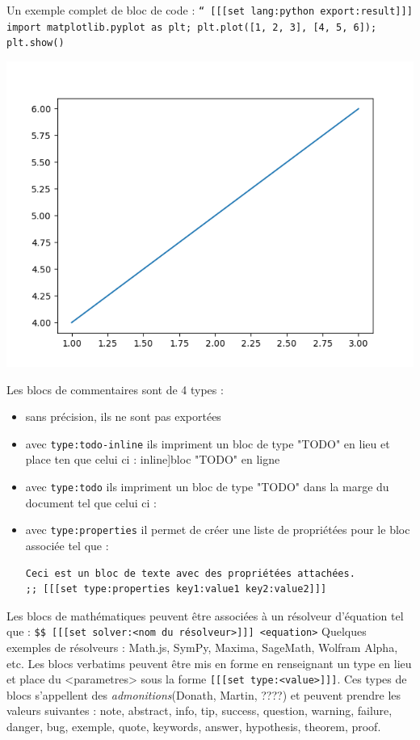 \documentclass[a4paper,12pt]{article}
\def\todo#1{}%
\begin{document}
Un exemple complet de bloc de code : \breakline
\texttt{`` [[[set lang:python export:result]]] import matplotlib.pyplot as plt; plt.plot([1, 2, 3], [4, 5, 6]); plt.show()}

\begin{center}
\includegraphics[width=.9\linewidth]{./quickDoc-exemple-code.png}
\end{center}

\newline
Les blocs de commentaires sont de 4 types :
\begin{itemize}
\item sans précision, ils ne sont pas exportées
\item avec \texttt{type:todo-inline} ils impriment un bloc de type "TODO" en lieu et place ten que celui ci : \todo[inline]{bloc "TODO" en ligne}
\item avec \texttt{type:todo} ils impriment un bloc de type "TODO" dans la marge du document tel que celui ci : \todo{e.g.}
\item avec \texttt{type:properties} il permet de créer une liste de propriétées pour le bloc associée tel que :
\begin{verbatim}
Ceci est un bloc de texte avec des propriétées attachées.
;; [[[set type:properties key1:value1 key2:value2]]]
\end{verbatim}
\end{itemize}
\newline
Les blocs de mathématiques peuvent être associées à un résolveur d'équation tel que :
\texttt{\$\$ [[[set solver:<nom du résolveur>]]] <equation>}
Quelques exemples de résolveurs : Math.js, SymPy, Maxima, SageMath, Wolfram Alpha, etc.
\newline
Les blocs verbatims peuvent être mis en forme en renseignant un type en lieu et place du <parametres> sous la forme \texttt{[[[set type:<value>]]]}. Ces types de blocs s'appellent des \emph{admonitions}(Donath, Martin, ????) et peuvent prendre les valeurs suivantes : note, abstract, info, tip, success, question, warning, failure, danger, bug, exemple, quote, keywords, answer, hypothesis, theorem, proof.
\end{document}
